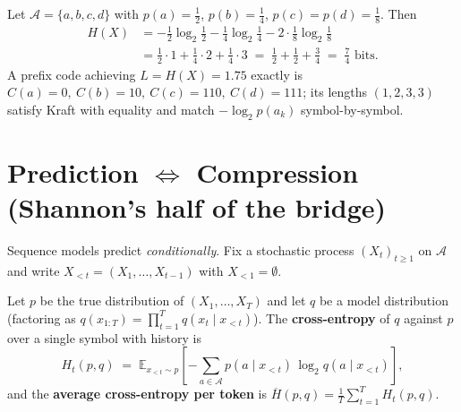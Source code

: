 \begin{example}
\label{ex:h4}
Let $\mathcal{A} = \{a, b, c, d\}$ with $p(a) = \tfrac{1}{2}$,
$p(b) = \tfrac{1}{4}$, $p(c) = p(d) = \tfrac{1}{8}$. Then
\begin{align*}
  H(X) &= -\tfrac{1}{2}\log_2\tfrac{1}{2}
         - \tfrac{1}{4}\log_2\tfrac{1}{4}
         - 2\cdot\tfrac{1}{8}\log_2\tfrac{1}{8} \\
       &= \tfrac{1}{2}\cdot 1 + \tfrac{1}{4}\cdot 2 + \tfrac{1}{4}\cdot 3
        \;=\; \tfrac{1}{2} + \tfrac{1}{2} + \tfrac{3}{4}
        \;=\; \tfrac{7}{4} \text{ bits}.
\end{align*}
A prefix code achieving $L = H(X) = 1.75$ exactly is
$C(a) = 0,\ C(b) = 10,\ C(c) = 110,\ C(d) = 111$; its lengths
$(1,2,3,3)$ satisfy Kraft with equality and match
$-\log_2 p(a_k)$ symbol-by-symbol.
\end{example}

\section{Prediction \texorpdfstring{$\Leftrightarrow$}{<=>} Compression (Shannon's half of the bridge)}
\label{sec:pred-comp}

Sequence models predict \emph{conditionally}. Fix a stochastic process
$(X_t)_{t \ge 1}$ on $\mathcal{A}$ and write $X_{<t} = (X_1, \dots,
X_{t-1})$ with $X_{<1} = \emptyset$.

\begin{definition}
\label{def:cross-ent}
Let $p$ be the true distribution of $(X_1, \dots, X_T)$ and let
$q$ be a model distribution (factoring as
$q(x_{1:T}) = \prod_{t=1}^{T} q(x_t \mid x_{<t})$). The
\textbf{cross-entropy} of $q$ against $p$ over a single symbol with
history is
\begin{equation}
  H_t(p, q)
  \;=\; \mathbb{E}_{x_{<t}\sim p}\!\left[
    -\sum_{a\in\mathcal{A}} p(a \mid x_{<t})\,\log_2 q(a \mid x_{<t})
  \right], \label{eq:cross-ent}
\end{equation}
and the \textbf{average cross-entropy per token} is
$\overline{H}(p,q) = \tfrac{1}{T}\sum_{t=1}^{T} H_t(p,q)$.
\end{definition}

